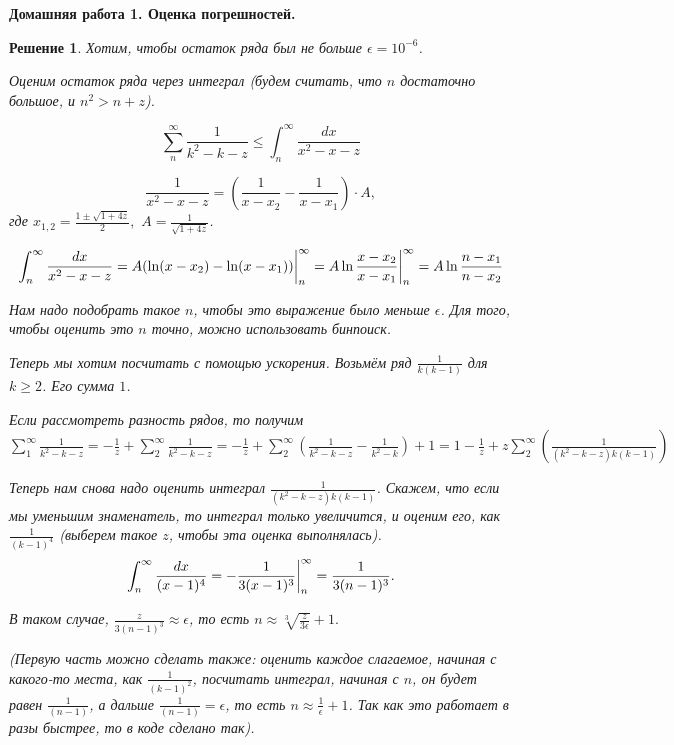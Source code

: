 \documentclass[12pt,fleqn,a4paper]{article}
\newtheorem*{solution}{Решение}
\newenvironment{task}[2] {
	\noindent\fbox{\bf {#1} {#2}.}
}{
}
\newcommand{\mytitle}[2] {
	\begin{center}
		\bf {#1} {#2}.
	\end{center}
}
\begin{document}
	\mytitle{Домашняя работа 1.}{Оценка погрешностей}
	
	\begin{task}{}{1}
	\end{task}
	\begin{solution}
	Хотим, чтобы остаток ряда был не больше $\epsilon = 10^{-6}$.
	
	Оценим остаток ряда через интеграл (будем считать, что $n$ достаточно большое, и $n^2 > n + z$).
	
	$$\sum_{n}^{\infty} \frac{1}{k^2 - k - z} \le \int_{n}^{\infty} \frac{dx}{x^2 - x - z}$$
	
	$$\frac{1}{x^2 - x - z} = (\frac{1}{x - x_2} - \frac{1}{x - x_1}) \cdot A,$$ где $x_{1, 2} = \frac{1 \pm \sqrt{1 + 4z}}{2}, \,\,  A = \frac{1}{\sqrt{1 + 4z}}$.

    $$ \int_{n}^{\infty} \frac{dx}{x^2 - x - z} = A( \ln (x - x_2) - \ln(x - x_1)) \bigg{|}_{n}^{\infty} = A \ln \frac{x - x_2}{x - x_1} \bigg{|}_{n}^{\infty} = A \ln \frac{n - x_1}{n - x_2}$$
    
    Нам надо подобрать такое $n$, чтобы это выражение было меньше $\epsilon$. Для того, чтобы оценить это $n$ точно, можно использовать бинпоиск.
    
    
    Теперь мы хотим посчитать с помощью ускорения. Возьмём ряд $\frac{1}{k(k - 1)}$ для $k \ge 2$. Его сумма $1$.
    
    Если рассмотреть разность рядов, то получим $\sum_{1}^{\infty} \frac{1}{k^2 - k - z} = - \frac{1}{z} + \sum_{2}^{\infty} \frac{1}{k^2 - k - z} = - \frac{1}{z} + \sum_{2}^{\infty} (\frac{1}{k^2 - k - z} - \frac{1}{k^2 - k}) + 1 = 1 - \frac{1}{z} + z \sum_{2}^{\infty}  (\frac{1}{(k^2 - k - z)k (k - 1)})$
    
    Теперь нам снова надо оценить интеграл $\frac{1}{(k^2 - k - z)k (k - 1)}$. Скажем, что если мы уменьшим знаменатель, то интеграл только увеличится, и оценим его, как $\frac{1}{(k - 1)^4}$ (выберем такое $z$, чтобы эта оценка выполнялась). $$\int_{n}^{\infty} \frac{dx}{(x - 1)^4} = -\frac{1}{3(x - 1)^3}\bigg{|}_{n}^{\infty} = \frac{1}{3(n - 1)^3}.$$
    
    В таком случае, $\frac{z}{3 (n - 1)^ 3} \approx \epsilon$, то есть $n \approx \sqrt[3]{\frac{z}{3 \epsilon}} + 1.$
    
    (Первую часть можно сделать также: оценить каждое слагаемое, начиная с какого-то места, как $\frac{1}{(k - 1)^2}$, посчитать интеграл, начиная с $n$, он будет равен $\frac{1}{(n - 1)}$, а дальше $\frac{1}{(n - 1)} =  \epsilon$, то есть $n \approx \frac{1}{\epsilon} + 1$. Так как это работает в разы быстрее, то в коде сделано так).
    
	\end{solution}
	
	
	
	
\end{document}

